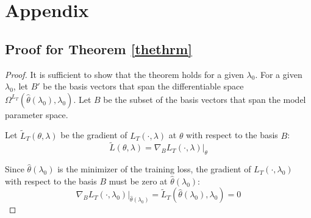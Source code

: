 \documentclass[10pt,letterpaper]{article}
\begin{document}
\section*{Appendix}

\subsection{Proof for Theorem \ref{thethrm}}


\begin{proof}
It is sufficient to show that the theorem holds for a given $\lambda_0$. For a given $\lambda_0$, let $B'$ be the basis vectors that span the differentiable space $\Omega^{L_T}(\hat \theta(\lambda_0), \lambda_0)$. Let $B$ be the subset of the basis vectors that span the model parameter space.

Let $\tilde L_T(\theta, \lambda)$ be the gradient of $L_T(\cdot, \lambda)$ at $\theta$ with respect to the basis $B$:
\begin{equation}
\tilde L(\theta, \lambda) = \nabla_{B} L_T(\cdot, \lambda) |_\theta
\end{equation}

Since $\hat \theta(\lambda_0)$ is the minimizer of the training loss, the gradient of $L_T(\cdot, \lambda_0)$ with respect to the basis $B$ must be zero at $\hat \theta(\lambda_0)$:
\begin{equation}
\nabla_{B} L_T(\cdot, \lambda_0)|_{\hat \theta(\lambda_0)} = \tilde L_T(\hat \theta(\lambda_0), \lambda_0) = 0
\end{equation}


\end{proof}
\end{document}
